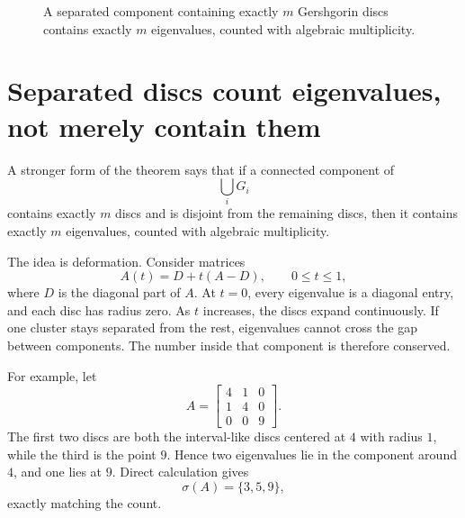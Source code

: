 \begin{figure}[H]
\centering
{}
\caption{A separated component containing exactly $m$ Gershgorin discs contains exactly $m$ eigenvalues, counted with algebraic multiplicity.}
\end{figure}

\section{Separated discs count eigenvalues, not merely contain them}

A stronger form of the theorem says that if a connected component of
\[
  \bigcup_iG_i
\]
contains exactly \(m\) discs and is disjoint from the remaining discs, then it contains exactly \(m\) eigenvalues, counted with algebraic multiplicity.

The idea is deformation.  Consider matrices
\[
  A(t)=D+t(A-D),
  \qquad 0\le t\le1,
\]
where \(D\) is the diagonal part of \(A\).  At \(t=0\), every eigenvalue is a diagonal entry, and each disc has radius zero.  As \(t\) increases, the discs expand continuously.  If one cluster stays separated from the rest, eigenvalues cannot cross the gap between components.  The number inside that component is therefore conserved.

For example, let
\[
  A=
  \begin{bmatrix}
    4&1&0\\
    1&4&0\\
    0&0&9
  \end{bmatrix}.
\]
The first two discs are both the interval-like discs centered at \(4\) with radius \(1\), while the third is the point \(9\).  Hence two eigenvalues lie in the component around \(4\), and one lies at \(9\).  Direct calculation gives
\[
  \sigma(A)=\{3,5,9\},
\]
exactly matching the count.

